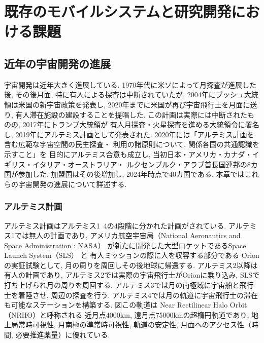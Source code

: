 \chapter{既存のモバイルシステムと研究開発における課題}
\label{chap:prerequisite_knowledge}

\section{近年の宇宙開発の進展}
宇宙開発は近年大きく進展している. 1970年代に米ソによって月探査が進展した後, 
その後月面, 特に有人による探査は中断されていたが, 
2004年にブッシュ大統領は米国の新宇宙政策を発表し, 
2020年までに米国が再び宇宙飛行士を月面に送り, 
有人滞在施設の建設することを提唱した\cite{久保田2009}.
この計画は実際には中断されたものの, 2017年にトランプ大統領が
有人月探査・火星探査を進める大統領令に署名し, 
2019年にアルテミス計画として発表された\cite{nasa2020}.
2020年には「アルテミス計画を含む広範な宇宙空間の民生探査・
利用の諸原則について, 関係各国の共通認識を示すこと」を
目的にアルテミス合意\cite{artemis_agreement1}も成立し, 
当初日本・アメリカ・カナダ・イギリス・イタリア・オーストラリア・
ルクセンブルク・アラブ首長国連邦の8カ国が参加した\cite{artemis_agreement2}. 
加盟国はその後増加し, 2024年時点で40カ国である\cite{artemis_agreement3}. 
本章ではこれらの宇宙開発の進展について詳述する. 

\subsection{アルテミス計画}
\label{section:月・火星の探査計画}
アルテミス計画はアルテミス1~4の4段階に分かれた計画がされている. 
アルテミス1では無人の計画であり, アメリカ航空宇宙局（National Aeronautics and Space Administration : NASA）
が新たに開発した大型ロケットであるSpace Launch System（SLS） と 有人ミッションの際に人を収容する部分である
Orionの実証試験として, 月の周りを周回しその後地球に帰還する. アルテミス2以降は有人の計画であり, 
アルテミス2では実際の宇宙飛行士がOrionに乗り込み, SLSで打ち上げられ月の周りを周回する. 
アルテミス3では月の南極域に宇宙船と飛行士を着陸させ, 周辺の探査を行う. 
アルテミス4では月の軌道に宇宙飛行士の滞在も可能なステーションを構築する. 
図この軌道は Near Rectilinear Halo Orbit （NRHO）と呼称される
近⽉点4000km, 遠⽉点75000kmの超楕円軌道であり, 
地上局常時可視性, 月南極の準常時可視性, 軌道の安定性, 
月面へのアクセス性（時間, 必要推進薬量）に優れている\cite{kiban_dai48}. 



